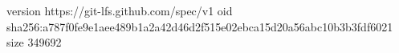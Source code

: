 version https://git-lfs.github.com/spec/v1
oid sha256:a787f0fe9e1aee489b1a2a42d46d2f515e02ebca15d20a56abc10b3b3fdf6021
size 349692
